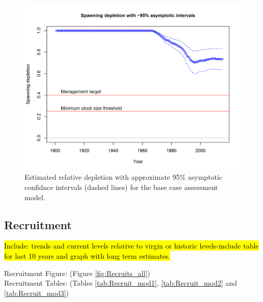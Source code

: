 \documentclass[12pt,]{article}
\begin{document}
\begin{figure}[htbp]
\centering
\includegraphics{r4ss/plots_mod1/ts9_Spawning_depletion_with_95_asymptotic_intervals_intervals.png}
\caption{Estimated relative depletion with approximate 95\% asymptotic
confidnce intervals (dashed lines) for the base case assessment model.
\label{fig:RelDeplete_all}}
\end{figure}

\FloatBarrier

\subsection*{Recruitment}\label{recruitment}

\hl{Include: trends and current levels relative to virgin or historic levels-include 
table for last 10 years and graph with long term estimates.}

Recruitment Figure: (Figure \ref{fig:Recruits_all})\\
Recruitment Tables: (Tables \ref{tab:Recruit_mod1},
\ref{tab:Recruit_mod2} and \ref{tab:Recruit_mod3})
\end{document}
